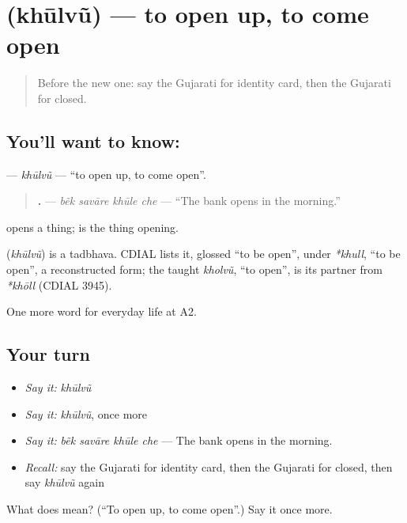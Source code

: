 \section[\texorpdfstring{\gu{ખૂલવું} (khūlvũ)}{ખૂલવું (khūlvũ)}]{ (khūlvũ) — to open up, to come open}

\label{lesson:GU-C197-khulvu}



\begin{quote}
Before the new one: say the Gujarati for identity card, then the Gujarati for closed.
\end{quote}

\subsection*{You'll want to know: }
\textbf{} — \emph{khūlvũ} — \textquotedblleft{}to open up, to come open\textquotedblright{}.

\begin{quote}
\textbf{   .} — \emph{bẽk savāre khūle che} — \textquotedblleft{}The bank opens in the morning.\textquotedblright{}
\end{quote}

\textbf{} opens a thing; \textbf{} is the thing opening.

\begin{cousinweb}
\textbf{} (\emph{khūlvũ}) is a tadbhava. CDIAL lists it, glossed \textquotedblleft{}to be open\textquotedblright{}, under \emph{*khull}, \textquotedblleft{}to be open\textquotedblright{}, a reconstructed form; the taught \emph{kholvũ}, \textquotedblleft{}to open\textquotedblright{}, is its partner from \emph{*khōll} (CDIAL 3945).
\end{cousinweb}

\begin{grammarlens}[title={What you've built}]
One more word for everyday life at A2.
\end{grammarlens}

\subsection*{Your turn}
\begin{itemize}
\raggedright
  \item \emph{Say it:} \emph{khūlvũ}
  \item \emph{Say it:} \emph{khūlvũ}, once more
  \item \emph{Say it:} \emph{bẽk savāre khūle che} — The bank opens in the morning.
  \item \emph{Recall:} say the Gujarati for identity card, then the Gujarati for closed, then say \emph{khūlvũ} again
\end{itemize}

\begin{tcolorbox}[breakable,colback=teal!4,colframe=teal!35!black,title={Before you move on}]
What does  mean? (\textquotedblleft{}To open up, to come open\textquotedblright{}.) Say it once more.
\end{tcolorbox}
